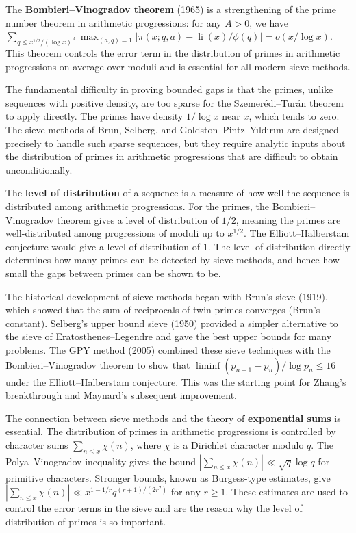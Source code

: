 The \textbf{Bombieri--Vinogradov theorem} (1965) is a strengthening of the prime number theorem in arithmetic progressions: for any $A > 0$, we have $\sum_{q \le x^{1/2}/(\log x)^A} \max_{(a,q)=1} |\pi(x;q,a) - \operatorname{li}(x)/\phi(q)| = o(x/\log x)$. This theorem controls the error term in the distribution of primes in arithmetic progressions on average over moduli and is essential for all modern sieve methods.

The fundamental difficulty in proving bounded gaps is that the primes, unlike sequences with positive density, are too sparse for the Szemer\'edi--Tur\'an theorem to apply directly. The primes have density $1/\log x$ near $x$, which tends to zero. The sieve methods of Brun, Selberg, and Goldston--Pintz--Y{\i}ld{\i}r{\i}m are designed precisely to handle such sparse sequences, but they require analytic inputs about the distribution of primes in arithmetic progressions that are difficult to obtain unconditionally.

The \textbf{level of distribution} of a sequence is a measure of how well the sequence is distributed among arithmetic progressions. For the primes, the Bombieri--Vinogradov theorem gives a level of distribution of $1/2$, meaning the primes are well-distributed among progressions of moduli up to $x^{1/2}$. The Elliott--Halberstam conjecture would give a level of distribution of $1$. The level of distribution directly determines how many primes can be detected by sieve methods, and hence how small the gaps between primes can be shown to be.

The historical development of sieve methods began with Brun's sieve (1919), which showed that the sum of reciprocals of twin primes converges (Brun's constant). Selberg's upper bound sieve (1950) provided a simpler alternative to the sieve of Eratosthenes--Legendre and gave the best upper bounds for many problems. The GPY method (2005) combined these sieve techniques with the Bombieri--Vinogradov theorem to show that $\liminf (p_{n+1} - p_n) / \log p_n \le 16$ under the Elliott--Halberstam conjecture. This was the starting point for Zhang's breakthrough and Maynard's subsequent improvement.

The connection between sieve methods and the theory of \textbf{exponential sums} is essential. The distribution of primes in arithmetic progressions is controlled by character sums $\sum_{n \le x} \chi(n)$, where $\chi$ is a Dirichlet character modulo $q$. The Polya--Vinogradov inequality gives the bound $|\sum_{n \le x} \chi(n)| \ll \sqrt{q} \log q$ for primitive characters. Stronger bounds, known as Burgess-type estimates, give $|\sum_{n \le x} \chi(n)| \ll x^{1-1/r} q^{(r+1)/(2r^2)}$ for any $r \ge 1$. These estimates are used to control the error terms in the sieve and are the reason why the level of distribution of primes is so important.

